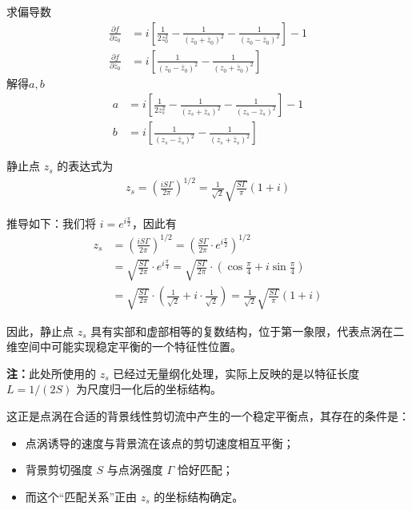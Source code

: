 求偏导数
\begin{align*}
    \frac{\partial f}{\partial z_{0}}&=
    i\left[\frac{1}{2z_{0}^{2}}-\frac{1}{(z_{0}+\bar{z}_{0})^{2}}-\frac{1}{(z_{0}-\bar{z}_{0})^{2}}\right]-1\\
    \frac{\partial f}{\partial \bar{z}_{0}}&=
    i\left[\frac{1}{(z_{0}-\bar{z}_{0})^{2}}-\frac{1}{(z_{0}+\bar{z}_{0})^{2}}\right]
\end{align*}
解得$a,b$
\begin{align*}
    a&=
    i\left[\frac{1}{2z_{s}^{2}}-\frac{1}{(z_{s}+\bar{z}_{s})^{2}}-\frac{1}{(z_{s}-\bar{z}_{s})^{2}}\right]-1\\
    b&=i\left[\frac{1}{(z_{s}-\bar{z}_{s})^{2}}-\frac{1}{(z_{s}+\bar{z}_{s})^{2}}\right]
\end{align*}

静止点 $z_{s}$ 的表达式为
\begin{align}
    \boxed{
    z_{s} = \left( \frac{iS\Gamma}{2\pi } \right)^{1/2}
    = \frac{1}{\sqrt{2}} \sqrt{\frac{S\Gamma}{\pi}} (1 + i)
    }
\end{align}

推导如下：我们将 \( i = e^{i\frac{\pi}{2}} \)，因此有
\begin{align*}
    z_s 
    &= \left( \frac{iS\Gamma}{2\pi} \right)^{1/2}
    = \left( \frac{S\Gamma}{2\pi} \cdot e^{i\frac{\pi}{2}} \right)^{1/2} \\
    &= \sqrt{\frac{S\Gamma}{2\pi}} \cdot e^{i\frac{\pi}{4}}
    = \sqrt{\frac{S\Gamma}{2\pi}} \cdot \left( \cos\frac{\pi}{4} + i\sin\frac{\pi}{4} \right) \\
    &= \sqrt{\frac{S\Gamma}{2\pi}} \cdot \left( \frac{1}{\sqrt{2}} + i\cdot \frac{1}{\sqrt{2}} \right)
    = \frac{1}{\sqrt{2}} \sqrt{\frac{S\Gamma}{\pi}} (1 + i)
\end{align*}

因此，静止点 $z_s$ 具有实部和虚部相等的复数结构，位于第一象限，代表点涡在二维空间中可能实现稳定平衡的一个特征性位置。

\textbf{注：}此处所使用的 $z_s$ 已经过无量纲化处理，实际上反映的是以特征长度 $L = 1/(2S)$ 为尺度归一化后的坐标结构。

这正是点涡在合适的背景线性剪切流中产生的一个稳定平衡点，其存在的条件是：

\begin{itemize}
    \item 点涡诱导的速度与背景流在该点的剪切速度相互平衡；
    \item 背景剪切强度 $S$ 与点涡强度 $\Gamma$ 恰好匹配；
    \item 而这个“匹配关系”正由 $z_s$ 的坐标结构确定。
\end{itemize}

